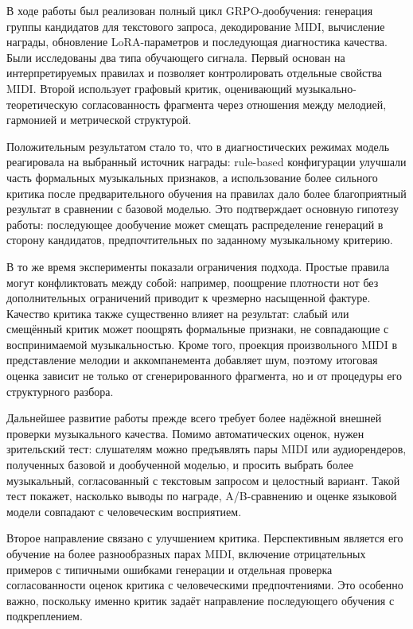 \documentclass[a4paper,12pt]{extarticle}
\begin{document}
В ходе работы был реализован полный цикл GRPO-дообучения: генерация группы
кандидатов для текстового запроса, декодирование MIDI, вычисление награды,
обновление LoRA-параметров и последующая диагностика качества. Были
исследованы два типа обучающего сигнала. Первый основан на интерпретируемых
правилах и позволяет контролировать отдельные свойства MIDI. Второй использует
графовый критик, оценивающий музыкально-теоретическую согласованность
фрагмента через отношения между мелодией, гармонией и метрической структурой.

Положительным результатом стало то, что в диагностических режимах модель
реагировала на выбранный источник награды: rule-based конфигурации улучшали
часть формальных музыкальных признаков, а использование более сильного
критика после предварительного обучения на правилах дало более благоприятный
результат в сравнении с базовой моделью. Это подтверждает основную гипотезу
работы: последующее дообучение может смещать распределение генераций в сторону
кандидатов, предпочтительных по заданному музыкальному критерию.

В то же время эксперименты показали ограничения подхода. Простые правила
могут конфликтовать между собой: например, поощрение плотности нот без
дополнительных ограничений приводит к чрезмерно насыщенной фактуре. Качество
критика также существенно влияет на результат: слабый или смещённый критик
может поощрять формальные признаки, не совпадающие с воспринимаемой
музыкальностью. Кроме того, проекция произвольного MIDI в представление
мелодии и аккомпанемента добавляет шум, поэтому итоговая оценка зависит не
только от сгенерированного фрагмента, но и от процедуры его структурного
разбора.

Дальнейшее развитие работы прежде всего требует более надёжной внешней
проверки музыкального качества. Помимо автоматических оценок, нужен
зрительский тест: слушателям можно предъявлять пары MIDI или аудиорендеров,
полученных базовой и дообученной моделью, и просить выбрать более музыкальный,
согласованный с текстовым запросом и целостный вариант. Такой тест покажет,
насколько выводы по награде, A/B-сравнению и оценке языковой модели совпадают
с человеческим восприятием.

Второе направление связано с улучшением критика. Перспективным является его
обучение на более разнообразных парах MIDI, включение отрицательных примеров с
типичными ошибками генерации и отдельная проверка согласованности оценок
критика с человеческими предпочтениями. Это особенно важно, поскольку именно
критик задаёт направление последующего обучения с подкреплением.
\end{document}
